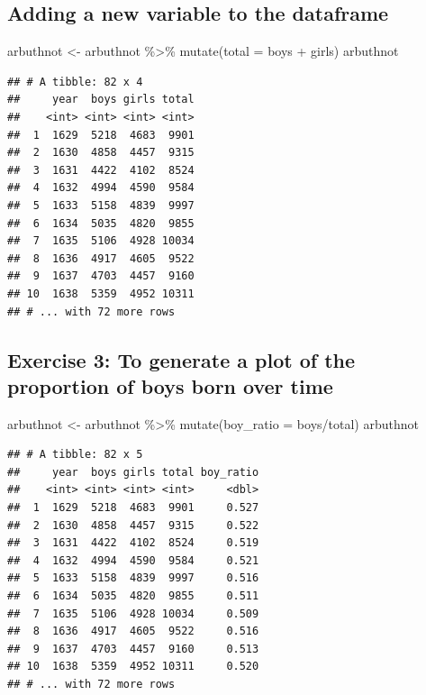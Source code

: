 \documentclass[
]{article}
\newenvironment{Shaded}{\begin{snugshade}}{\end{snugshade}}
\newcommand{\AttributeTok}[1]{\textcolor[rgb]{0.77,0.63,0.00}{#1}}
\newcommand{\FunctionTok}[1]{\textcolor[rgb]{0.00,0.00,0.00}{#1}}
\newcommand{\NormalTok}[1]{#1}
\newcommand{\OtherTok}[1]{\textcolor[rgb]{0.56,0.35,0.01}{#1}}
\newcommand{\SpecialCharTok}[1]{\textcolor[rgb]{0.00,0.00,0.00}{#1}}
\begin{document}
\hypertarget{adding-a-new-variable-to-the-dataframe}{%
\subsection{Adding a new variable to the
dataframe}\label{adding-a-new-variable-to-the-dataframe}}

\begin{Shaded}
\begin{Highlighting}[]
\NormalTok{arbuthnot }\OtherTok{\textless{}{-}}\NormalTok{ arbuthnot }\SpecialCharTok{\%\textgreater{}\%}
  \FunctionTok{mutate}\NormalTok{(}\AttributeTok{total =}\NormalTok{ boys }\SpecialCharTok{+}\NormalTok{ girls)}
\NormalTok{arbuthnot}
\end{Highlighting}
\end{Shaded}

\begin{verbatim}
## # A tibble: 82 x 4
##     year  boys girls total
##    <int> <int> <int> <int>
##  1  1629  5218  4683  9901
##  2  1630  4858  4457  9315
##  3  1631  4422  4102  8524
##  4  1632  4994  4590  9584
##  5  1633  5158  4839  9997
##  6  1634  5035  4820  9855
##  7  1635  5106  4928 10034
##  8  1636  4917  4605  9522
##  9  1637  4703  4457  9160
## 10  1638  5359  4952 10311
## # ... with 72 more rows
\end{verbatim}

\hypertarget{exercise-3-to-generate-a-plot-of-the-proportion-of-boys-born-over-time}{%
\subsection{Exercise 3: To generate a plot of the proportion of boys
born over
time}\label{exercise-3-to-generate-a-plot-of-the-proportion-of-boys-born-over-time}}

\begin{Shaded}
\begin{Highlighting}[]
\NormalTok{arbuthnot }\OtherTok{\textless{}{-}}\NormalTok{ arbuthnot }\SpecialCharTok{\%\textgreater{}\%}
  \FunctionTok{mutate}\NormalTok{(}\AttributeTok{boy\_ratio =}\NormalTok{ boys}\SpecialCharTok{/}\NormalTok{total)}
\NormalTok{arbuthnot}
\end{Highlighting}
\end{Shaded}

\begin{verbatim}
## # A tibble: 82 x 5
##     year  boys girls total boy_ratio
##    <int> <int> <int> <int>     <dbl>
##  1  1629  5218  4683  9901     0.527
##  2  1630  4858  4457  9315     0.522
##  3  1631  4422  4102  8524     0.519
##  4  1632  4994  4590  9584     0.521
##  5  1633  5158  4839  9997     0.516
##  6  1634  5035  4820  9855     0.511
##  7  1635  5106  4928 10034     0.509
##  8  1636  4917  4605  9522     0.516
##  9  1637  4703  4457  9160     0.513
## 10  1638  5359  4952 10311     0.520
## # ... with 72 more rows
\end{verbatim}
\end{document}
